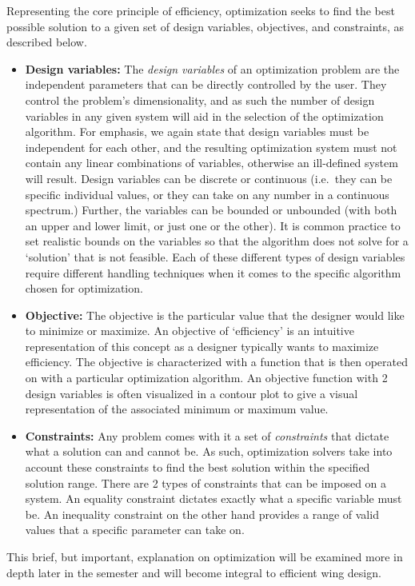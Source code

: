 \documentclass{report}
\begin{document}
Representing the core principle of efficiency, optimization seeks to find the best possible solution to a given set of design variables, objectives, and constraints, as described below.
    \begin{itemize}
        \item[] \textbf{Design variables:} The \textit{design variables} of an optimization problem are the independent parameters that can be directly controlled by the user. They control the problem's dimensionality, and as such the number of design variables in any given system will aid in the selection of the optimization algorithm.
        For emphasis, we again state that design variables must be independent for each other, and the resulting optimization system must not contain any linear combinations of variables, otherwise an ill-defined system will result.
        Design variables can be discrete or continuous (i.e.\ they can be specific individual values, or they can take on any number in a continuous spectrum.)
        Further, the variables can be bounded or unbounded (with both an upper and lower limit, or just one or the other). It is common practice to set realistic bounds on the variables so that the algorithm does not solve for a `solution' that is not feasible.
        Each of these different types of design variables require different handling techniques when it comes to the specific algorithm chosen for optimization.
        \item[] \textbf{Objective:} The objective is the particular value that the designer would like to minimize or maximize. An objective of `efficiency' is an intuitive representation of this concept as a designer typically wants to maximize efficiency.
        The objective is characterized with a function that is then operated on with a particular optimization algorithm. An objective function with 2 design variables is often visualized in a contour plot to give a visual representation of the associated minimum or maximum value.
        \item[] \textbf{Constraints:} Any problem comes with it a set of \textit{constraints} that dictate what a solution can and cannot be. As such, optimization solvers take into account these constraints to find the best solution within the specified solution range.
        There are 2 types of constraints that can be imposed on a system. An equality constraint dictates exactly what a specific variable must be. An inequality constraint on the other hand provides a range of valid values that a specific parameter can take on.
    \end{itemize}
This brief, but important, explanation on optimization will be examined more in depth later in the semester and will become integral to efficient wing design.
\end{document}
